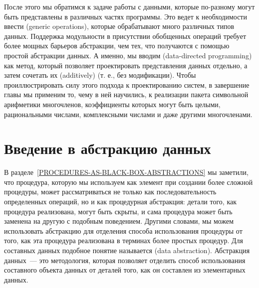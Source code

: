 После этого мы обратимся к задаче работы с данными, которые
по-разному могут быть представлены в различных частях программы.  Это
ведет к необходимости ввести 
 (generic operations), которые обрабатывают много различных 
типов данных.  Поддержка модульности в присутствии обобщенных операций
требует более мощных барьеров абстракции, чем тех, что получаются 
с помощью простой абстракции данных.  А именно, мы вводим
 (data-directed programming) как метод, который позволяет проектировать
представления данных отдельно, а затем сочетать их 
 (additively) (т. е., без модификации).
Чтобы про\-иллюстрировать силу этого подхода к проектированию систем, в
завершение главы мы применим то, чему в ней научились, к реализации
пакета символьной арифметики многочленов, коэффициенты которых
могут быть целыми, рациональными числами, комплексными
числами и даже другими многочленами.

\section{Введение в абстракцию данных}
\label{INTRODUCTION-TO-DATA-ABSTRACTION}

В разделе~\ref{PROCEDURES-AS-BLACK-BOX-ABSTRACTIONS} мы заметили, 
что процедура, которую мы используем как элемент при создании более
сложной процедуры, может рассматриваться не только как
последовательность определенных операций, но и как процедурная
абстракция: детали того, как процедура реализована, могут
быть скрыты, и сама процедура может быть заменена на другую с подобным
поведением.  Другими словами, мы можем использовать
абстракцию для отделения способа использования процедуры от того, как
эта процедура реализована в терминах более простых процедур.
Для составных данных подобное понятие называется 
 (data abstraction).  Абстракция
данных~--- это методология, которая позволяет
отделить способ использования составного объекта данных от деталей того, как
он составлен из элементарных данных.

